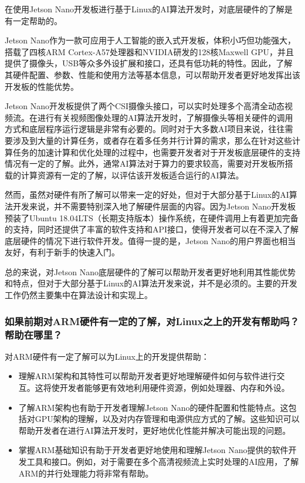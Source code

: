 \documentclass[UTF8]{article}
\begin{document}
在使用Jetson Nano开发板进行基于Linux的AI算法开发时，对底层硬件的了解是有一定帮助的。

Jetson Nano作为一款可应用于人工智能的嵌入式开发板，体积小巧但功能强大，搭载了四核ARM Cortex-A57处理器和NVIDIA研发的128核Maxwell GPU，并且提供了摄像头，USB等众多外设扩展和接口，还具有低功耗的特性。因此，了解其硬件配置、参数、性能和使用方法等基本信息，可以帮助开发者更好地发挥出该开发板的性能优势。

Jetson Nano开发板提供了两个CSI摄像头接口，可以实时处理多个高清全动态视频流。在进行有关视频图像处理的AI算法开发时，了解摄像头等相关硬件的调用方式和底层程序运行逻辑是非常有必要的。同时对于大多数AI项目来说，往往需要涉及到大量的计算任务，或者存在着多任务并行计算的需求，那么在针对这些计算任务的加速计算和优化处理的过程中，也需要开发者对于开发板底层硬件的支持情况有一定的了解。此外，通常AI算法对于算力的要求较高，需要对开发板所搭载的计算资源有一定的了解，以评估该开发板适合运行的AI算法。

然而，虽然对硬件有所了解可以带来一定的好处，但对于大部分基于Linux的AI算法开发来说，并不需要特别深入地了解硬件层面的内容。因为Jetson Nano开发板预装了Ubuntu 18.04LTS（长期支持版本）操作系统，在硬件调用上有着更加完备的支持，同时还提供了丰富的软件支持和API接口，使得开发者可以在不深入了解底层硬件的情况下进行软件开发。值得一提的是，Jetson Nano的用户界面也相当友好，有利于新手的快速入门。

总的来说，对Jetson Nano底层硬件的了解可以帮助开发者更好地利用其性能优势和特点，但对于大部分基于Linux的AI算法开发来说，并不是必须的。主要的开发工作仍然主要集中在算法设计和实现上。

\subsubsection{如果前期对ARM硬件有一定的了解，对Linux之上的开发有帮助吗？帮助在哪里？} 
对ARM硬件有一定了解可以为Linux上的开发提供帮助：
\begin{itemize}
    \item 理解ARM架构和其特性可以帮助开发者更好地理解硬件如何与软件进行交互。这将使开发者能够更有效地利用硬件资源，例如处理器、内存和外设。
    \item 了解ARM架构也有助于开发者理解Jetson Nano的硬件配置和性能特点。这包括对GPU架构的理解，以及对内存管理和电源供应方式的了解。这些知识可以帮助开发者在进行AI算法开发时，更好地优化性能并解决可能出现的问题。
    \item 掌握ARM基础知识有助于开发者更好地使用和理解Jetson Nano提供的软件开发工具和接口。例如，对于需要在多个高清视频流上实时处理的AI应用，了解ARM的并行处理能力将非常有帮助。
\end{itemize}
\end{document}
